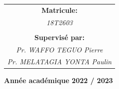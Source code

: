 \begin{titlepage}
\begin{center}
\begin{tabular}{c}
					\hspace{0.02cm}\textbf{\textbf{Matricule:}}\\
					\vspace{0.2cm}
					\hspace{0.02cm} \textsl{18T2603}\\\\
					
					\hspace{0.02cm}\textbf{Supervisé par: }\\ \textsl{Pr. WAFFO TEGUO Pierre}\\\hspace{0.02cm} \textsl{Pr. MELATAGIA YONTA Paulin}\\ 
				
				\end{tabular}
            \vspace{0.4cm}
			\end{center}
			\vspace{0.6cm}
			\begin{center}
				\textbf{Année académique 2022 / 2023}
			\end{center}
			
			\vspace{-0.75cm}
								
				
					
							
	

\end{titlepage}
